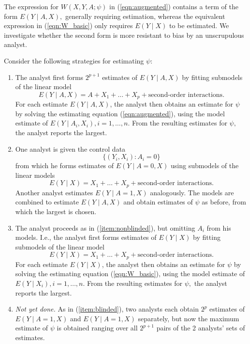 \message{ !name(manuscript.tex)}\documentclass[10pt,a4paper]{amsart}
\newcommand{\PP}{P}
\begin{document}

The expression for $W(X,Y,A;\psi)$ in (\ref{eqn:augmented}) contains a term
of the form $E(Y\mid A,X),$ generally requiring estimation, whereas the equivalent expression in
(\ref{eqn:W_basic}) only requires $E(Y\mid X)$ to be estimated. We
investigate whether the second form is more resistant to bias by an
unscrupulous analyst.

Consider the following strategies for estimating $\psi$:
\begin{enumerate}
\item \label{item:nonblinded} The analyst first forms $2^{p+1}$
  estimates of $E(Y\mid A,X)$ by fitting submodels of the linear model
  \[E(Y\mid A,X) = A + X_1 + \ldots + X_p + \text{second-order interactions}.\]
  For each estimate $E(Y\mid A,X)$, the analyst
  then obtains an estimate for $\psi$ by solving the estimating equation (\ref{eqn:augmented}),
  using the model estimate of $E(Y\mid A_i,X_i), i=1,\ldots,n.$ From
  the resulting estimates for $\psi,$ the analyst reports the
  largest.
\item \label{item:blinded} One analyst is given the control data
  \[\{(Y_i,X_i) : A_i=0\}\]
  from which he forms estimates of $E(Y\mid A=0, X)$ using submodels
  of the linear models
\[E(Y\mid X) = X_1 + \ldots + X_p + \text{second-order
    interactions}.\]
Another analyst estimates $E(Y\mid A=1,X)$ analogously. The models
  are combined to estimate $E(Y\mid A,X)$ and obtain estimates of
  $\psi$ as before, from which the largest is chosen.
\item \label{item:ours} The analyst proceeds as in (\ref{item:nonblinded}), but omitting $A_i$
  from his models. I.e., the analyst first forms
  estimates of $E(Y\mid X)$ by fitting submodels of the linear model
  \[E(Y\mid X) = X_1 + \ldots + X_p + \text{second-order interactions}.\]
  For each estimate $E(Y\mid X)$, the analyst
  then obtains an estimate for $\psi$ by solving the estimating equation (\ref{eqn:W_basic}),
  using the model estimate of $E(Y\mid X_i), i=1,\ldots,n.$ From
  the resulting estimates for $\psi,$ the analyst reports the
  largest.
  \item \emph{Not yet done.} As in (\ref{item:blinded}), two analysts each obtain $2^p$
    estimates of $E(Y\mid
    A=1,X)$ and $E(Y\mid A=1,X)$ separately, but now the maximum estimate
    of $\psi$ is obtained ranging over all $2^{p+1}$ pairs of the 2
    analysts' sets of estimates.
\end{enumerate}
\end{document}

